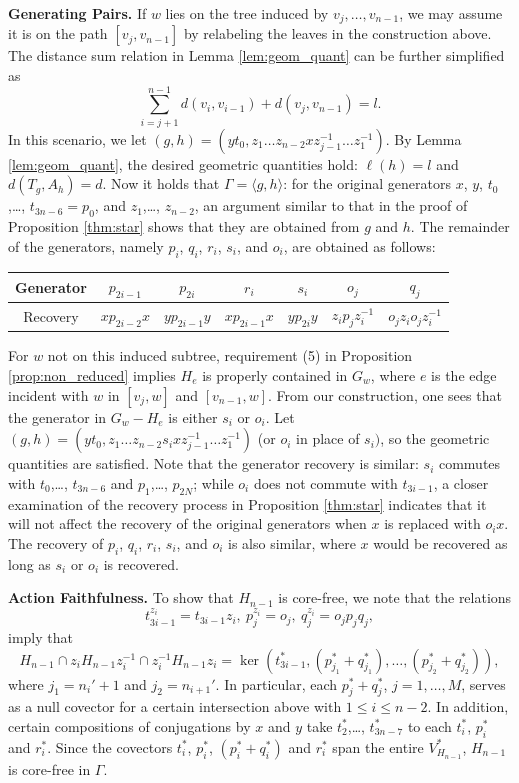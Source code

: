 \documentclass[12pt,leqno]{amsart}
\makeatletter
\renewenvironment{proof}[1][\proofname]{%
	\par
	\pushQED{\qed}%
	\normalfont
	\topsep6\p@\@plus6\p@\relax
	\trivlist
	\item[\hskip\labelsep\itshape #1\@addpunct{.}]%
	\ignorespaces
}{%
	\par\nobreak\vspace{2pt}%
	\popQED%
	\medskip%
	\endtrivlist
	\@endpefalse
}
\newcommand{\2}{L^2_{\rm per}(0, T)}
\numberwithin{equation}{section}
\numberwithin{figure}{section}
\makeatother
\begin{document}
\begin{proof}[Proof of Theorem \ref{thm:ellip_gog}, $Y$ is a tree]
    \textbf{Generating Pairs.} If $w$ lies on the tree induced by $v_j,\dots, v_{n-1}$, we may assume it is on the path $[v_j,v_{n-1}]$ by relabeling the leaves in the construction above. The distance sum relation in Lemma \ref{lem:geom_quant} can be further simplified as
    \[
    \sum_{i=j+1}^{n-1}d(v_{i},v_{i-1}) + d(v_{j},v_{n-1}) = l.
    \]
    In this scenario, we let $(g,h) = (yt_0,z_1\dots z_{n-2}xz_{j-1}^{-1}\dots z_1^{-1})$. By Lemma \ref{lem:geom_quant}, the desired geometric quantities hold: $\ell(h) = l$ and $d(T_g,A_h) = d$. Now it holds that $\Gamma = \langle g,h\rangle$: for the original generators $x$, $y$, $t_0$,\dots, $t_{3n-6}=p_0$, and $z_1$,\dots, $z_{n-2}$, an argument similar to that in the proof of Proposition \ref{thm:star} shows that they are obtained from $g$ and $h$. The remainder of the generators, namely $p_i$, $q_i$, $r_i$, $s_i$, and $o_i$, are obtained as follows:
    \begin{center}
        \begin{tabular}{c||c|c|c|c|c|c}
            Generator & $p_{2i-1}$ & $p_{2i}$ & $r_i$ & $s_i$ & $o_j$ & $q_j$ \\
            \hline
            Recovery & $xp_{2i-2}x$ & $yp_{2i-1}y$ & $xp_{2i-1}x$ & $yp_{2i}y$ & $z_ip_jz_i^{-1}$ & $o_jz_io_jz_i^{-1}$
        \end{tabular}
    \end{center}
    For $w$ not on this induced subtree, requirement (5) in Proposition \ref{prop:non_reduced} implies $H_e$ is properly contained in $G_w$, where $e$ is the edge incident with $w$ in $[v_j,w]$ and $[v_{n-1},w]$. From our construction, one sees that the generator in $G_w-H_e$ is either $s_i$ or $o_i$. Let $(g,h) = (yt_0,z_1\dots z_{n-2}s_ixz_{j-1}^{-1}\dots z_1^{-1})$ (or $o_i$ in place of $s_i)$, so the geometric quantities are satisfied. Note that the generator recovery is similar: $s_i$ commutes with $t_0$,\dots, $t_{3n-6}$ and $p_1$,\dots, $p_{2N}$; while $o_i$ does not commute with $t_{3i-1}$, a closer examination of the recovery process in Proposition \ref{thm:star} indicates that it will not affect the recovery of the original generators when $x$ is replaced with $o_ix$. The recovery of $p_i$, $q_i$, $r_i$, $s_i$, and $o_i$ is also similar, where $x$ would be recovered as long as $s_i$ or $o_i$ is recovered.

    \textbf{Action Faithfulness.} To show that $H_{n-1}$ is core-free, we note that the relations
    \[
    t_{3i-1}^{z_i} = t_{3i-1}z_i,\ p_j^{z_i} = o_j,\ q_j^{z_i} = o_jp_jq_j,
    \]
    imply that
    \[
    H_{n-1}\cap z_iH_{n-1}z_i^{-1}\cap z_i^{-1}H_{n-1}z_i = \ker(t_{3i-1}^*,(p_{j_1}^*+q_{j_1}^*),\dots,(p_{j_2}^*+q_{j_2}^*)),
    \]
    where $j_1 = n_i'+1$ and $j_2 = n_{i+1}'$. In particular, each $p_j^*+q_j^*$, $j=1,\dots, M$, serves as a null covector for a certain intersection above with $1\leq i\leq n-2$. In addition, certain compositions of conjugations by $x$ and $y$ take $t_2^*$,\dots, $t_{3n-7}^*$ to each $t_i^*$, $p_i^*$ and $r_i^*$. Since the covectors $t_i^*$, $p_i^*$, $(p_i^*+q_i^*)$ and $r_i^*$ span the entire $V_{H_{n-1}}^*$, $H_{n-1}$ is core-free in $\Gamma$.
\end{proof}
\end{document}
